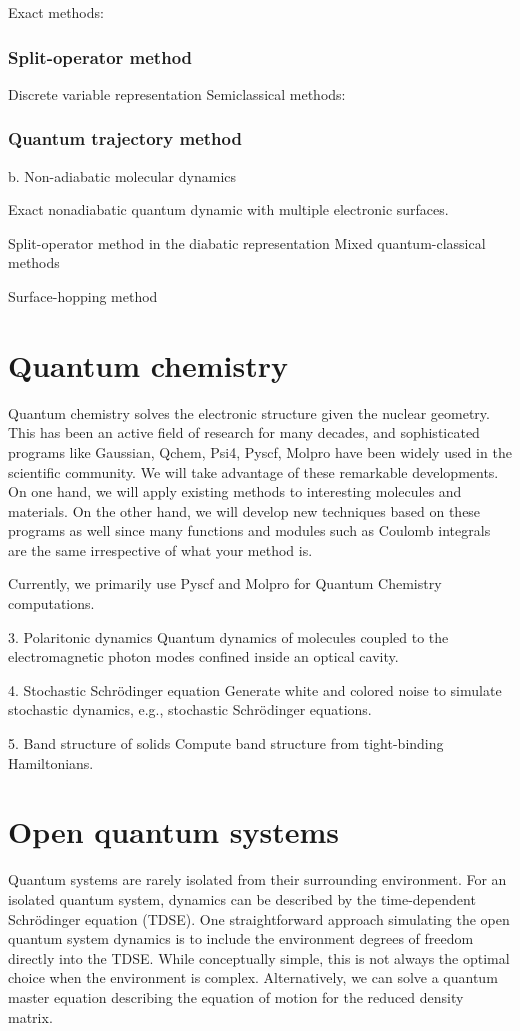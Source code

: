 \documentclass[a4paper,12pt]{book}
\begin{document}
Exact methods:

\subsection{Split-operator method}
Discrete variable representation
Semiclassical methods:

\subsection{Quantum trajectory method}
b. Non-adiabatic molecular dynamics

Exact nonadiabatic quantum dynamic with multiple electronic surfaces.

Split-operator method in the diabatic representation
Mixed quantum-classical methods

Surface-hopping method
\chapter{Quantum chemistry}
Quantum chemistry solves the electronic structure given the nuclear geometry. This has been an active field of research for many decades, and sophisticated programs like Gaussian, Qchem, Psi4, Pyscf, Molpro have been widely used in the scientific community. We will take advantage of these remarkable developments. On one hand, we will apply existing methods to interesting molecules and materials. On the other hand, we will develop new techniques based on these programs as well since many functions and modules such as Coulomb integrals are the same irrespective of what your method is.

Currently, we primarily use Pyscf and Molpro for Quantum Chemistry computations.

3. Polaritonic dynamics
Quantum dynamics of molecules coupled to the electromagnetic photon modes confined inside an optical cavity.

4. Stochastic Schrödinger equation
Generate white and colored noise to simulate stochastic dynamics, e.g., stochastic Schrödinger equations.

5. Band structure of solids
Compute band structure from tight-binding Hamiltonians.

\chapter{Open quantum systems}
Quantum systems are rarely isolated from their surrounding environment. For an isolated quantum system, dynamics can be described by the time-dependent Schrödinger equation (TDSE). One straightforward approach simulating the open quantum system dynamics is to include the environment degrees of freedom directly into the TDSE. While conceptually simple, this is not always the optimal choice when the environment is complex. Alternatively, we can solve a quantum master equation describing the equation of motion for the reduced density matrix.
\end{document}
